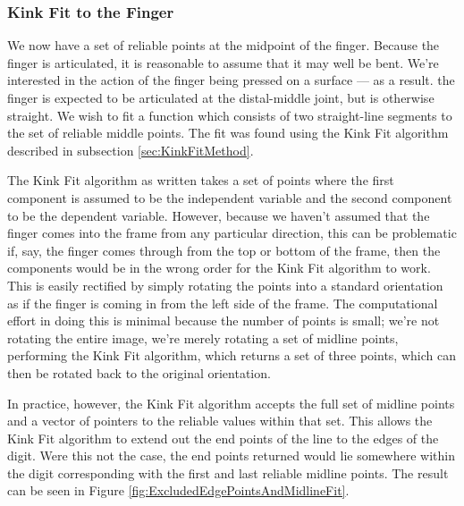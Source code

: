 \subsubsection{Kink Fit to the Finger}\label{sec:KinkFitToTheFinger}
We now have a set of reliable points at the midpoint of the finger. Because the finger is articulated, it is reasonable to assume that it may well be bent. We're interested in the action of the finger being pressed on a surface --- as a result. the finger is expected to be articulated at the distal-middle joint, but is otherwise straight. We wish to fit a function which consists of two straight-line segments to the set of reliable middle points. The fit was found using the Kink Fit algorithm described in subsection \ref{sec:KinkFitMethod}.

The Kink Fit algorithm as written takes a set of points where the first component is assumed to be the independent variable and the second component to be the dependent variable. However, because we haven't assumed that the finger comes into the frame from any particular direction, this can be problematic if, say, the finger comes through from the top or bottom of the frame, then the components would be in the wrong order for the Kink Fit algorithm to work. This is easily rectified by simply rotating the points into a standard orientation as if the finger is coming in from the left side of the frame. The computational effort in doing this is minimal because the number of points is small; we're not rotating the entire image, we're merely rotating a set of midline points, performing the Kink Fit algorithm, which returns a set of three points, which can then be rotated back to the original orientation.

In practice, however, the Kink Fit algorithm accepts the full set of midline points and a vector of pointers to the reliable values within that set. This allows the Kink Fit algorithm to extend out the end points of the line to the edges of the digit. Were this not the case, the end points returned would lie somewhere within the digit corresponding with the first and last reliable midline points. The result can be seen in Figure \ref{fig:ExcludedEdgePointsAndMidlineFit}.

